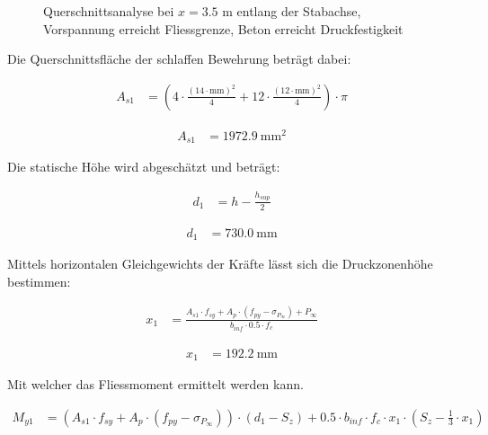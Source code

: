 \documentclass[
  11pt,
  letterpaper,
]{scrreprt}
\begin{document}
\begin{figure}[H]


\caption{\label{fig-t6_qs_My_pos}Querschnittsanalyse bei \(x=3.5\) m
entlang der Stabachse, Vorspannung erreicht Fliessgrenze, Beton erreicht
Druckfestigkeit}

\end{figure}%

Die Querschnittsfläche der schlaffen Bewehrung beträgt dabei:

$$
\begin{aligned}
A_{s1} &= \left( 4 \cdot \frac{ \left( 14 \cdot \mathrm{mm} \right) ^{ 2 } }{ 4 } + 12 \cdot \frac{ \left( 12 \cdot \mathrm{mm} \right) ^{ 2 } }{ 4 } \right) \cdot \pi \; 
\end{aligned}
$$

$$
\begin{aligned}
A_{s1} &= 1972.9\ \mathrm{mm}^{2} \;
\end{aligned}
$$

Die statische Höhe wird abgeschätzt und beträgt:

$$
\begin{aligned}
d_{1} &= h - \frac{ h_{sup} }{ 2 } \; 
\end{aligned}
$$

$$
\begin{aligned}
d_{1} &= 730.0\ \mathrm{mm} \;
\end{aligned}
$$

Mittels horizontalen Gleichgewichts der Kräfte lässt sich die
Druckzonenhöhe bestimmen:

$$
\begin{aligned}
x_{1} &= \frac{ A_{s1} \cdot f_{sy} + A_{p} \cdot \left( f_{py} - \sigma_{P_{\infty}} \right) + P_{\infty} }{ b_{inf} \cdot 0.5 \cdot f_{c} } \; 
\end{aligned}
$$

$$
\begin{aligned}
x_{1} &= 192.2\ \mathrm{mm} \;
\end{aligned}
$$

Mit welcher das Fliessmoment ermittelt werden kann.

$$
\begin{aligned}
M_{y1} &= \left( A_{s1} \cdot f_{sy} + A_{p} \cdot \left( f_{py} - \sigma_{P_{\infty}} \right) \right) \cdot \left( d_{1} - S_{z} \right) + 0.5 \cdot b_{inf} \cdot f_{c} \cdot x_{1} \cdot \left( S_{z} - \frac{ 1 }{ 3 } \cdot x_{1} \right) \; 
\end{aligned}
$$
\end{document}
